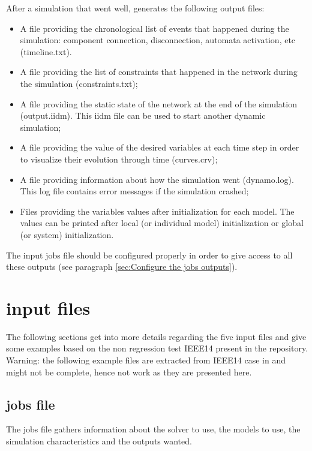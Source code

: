 \documentclass[a4paper, 12pt]{report}
\begin{document}
After a simulation that went well, \Dynawo generates the following output files:
\begin{itemize}
\item A file providing the chronological list of events that happened during the simulation: component connection, disconnection, automata activation, etc (timeline.txt).
\item A file providing the list of constraints that happened in the network during the simulation (constraints.txt);
\item A file providing the static state of the network at the end of the simulation (output.iidm). This iidm file can be used to start another dynamic simulation;
\item A file providing the value of the desired variables at each time step in order to visualize their evolution through time (curves.crv);
\item A file providing information about how the simulation went (dynamo.log). This log file contains error messages if the simulation crashed;
\item Files providing the variables values after initialization for each model. The values can be printed after local (or individual model) initialization or global (or system) initialization.
\end{itemize}

The input jobs file should be configured properly in order to give access to all these outputs (see paragraph \ref{sec:Configure the jobs outputs}).

\section[Dynawo input files]{\Dynawo input files}

The following sections get into more details regarding the five input files and give some examples based on the non regression test IEEE14 present in the \Dynawo repository. \\
Warning: the following example files are extracted from IEEE14 case in \Dynawo and might not be complete, hence not work as they are presented here.

\subsection{jobs file}

The jobs file gathers information about the solver to use, the models to use, the simulation characteristics and the outputs wanted.
\end{document}
